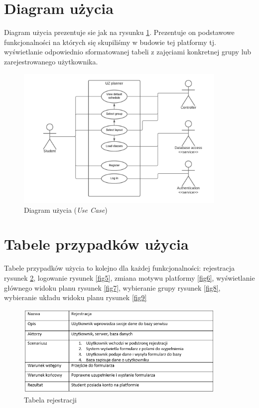 \documentclass[a4paper,11pt]{uzreport}
\begin{document}
\section{Diagram użycia}

    Diagram użycia prezentuje sie jak na rysunku \ref{diagram_uzyca}. Prezentuje on podstawowe funkcjonalności na których się skupiliśmy w budowie tej platformy tj. wyświetlanie odpowiednio sformatowanej tabeli z zajęciami konkretnej grupy lub zarejestrowanego użytkownika.

    \begin{figure}[ht!]
        \centering
        \includegraphics[width=0.9\textwidth]{pictures/use_case.png}
        \caption{Diagram użycia (\textit{Use Case})}
        \label{diagram_uzyca}
     \end{figure}

\section{Tabele przypadków użycia}

    Tabele przypadków użycia to kolejno dla każdej funkcjonalności: rejestracja rysunek \ref{fig4}, logowanie rysunek \ref{fig5}, zmiana motywu platformy \ref{fig6}, wyświetlanie głównego widoku planu rysunek \ref{fig7}, wybieranie grupy rysunek \ref{fig8}, wybieranie układu widoku planu rysunek \ref{fig9} \\

    \begin{figure}[ht!]
        \centering
        \includegraphics[width=0.9\textwidth]{pictures/rejestracja.PNG}
        \caption{Tabela rejestracji}
        \label{fig4}
     \end{figure}
\end{document}
